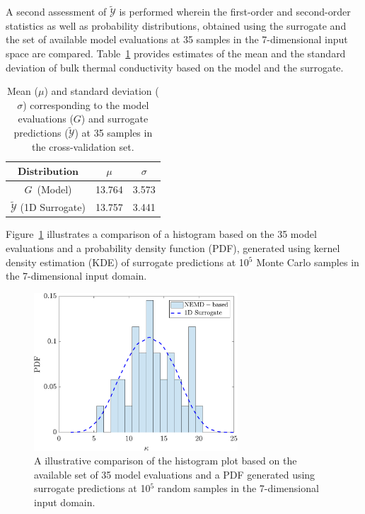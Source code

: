A second assessment of $\tilde{\mathcal{Y}}$ is performed wherein
the first-order and second-order 
statistics as well as probability distributions, obtained using the
surrogate and the set of available model evaluations at 35 samples in the 7-dimensional
input space are compared. Table~\ref{tab:verify} provides estimates of the
mean and the standard deviation of bulk thermal conductivity based on the model and the
surrogate. 
%
\begin{table}[htbp]
\begin{center}
\begin{tabular}{ccc}
\toprule
$\textbf{Distribution}$ & $\mu$ & $\sigma$ \\ 
\bottomrule
$G$~(Model) & 13.764 & 3.573 \\
$\tilde{\mathcal{Y}}$ (1D Surrogate) & 13.757 & 3.441 \\
\bottomrule
\end{tabular}
\end{center}
\caption{Mean ($\mu$) and standard deviation ($\sigma$) corresponding to
the model evaluations ($G$) and surrogate predictions ($\tilde{\mathcal{Y}}$)
at 35 samples in the cross-validation set.}
\label{tab:verify}
\end{table}
%
Figure~\ref{fig:level2} illustrates a comparison of a histogram based on the 35 model evaluations
and a probability density function (PDF), generated using kernel density estimation (KDE)
of surrogate predictions at 10$^5$ Monte Carlo samples in the 7-dimensional input domain. 
\begin{figure}[htbp]
\begin{center}
\includegraphics[width=3.0in]{./Figures/free_pdf_comp_SSP1D}
\end{center} 
\caption{A illustrative comparison of the histogram plot based on the
available set of 35 model evaluations and a PDF generated using surrogate predictions at 10$^5$
random samples in the 7-dimensional input domain.}  
\label{fig:level2}
\end{figure}
